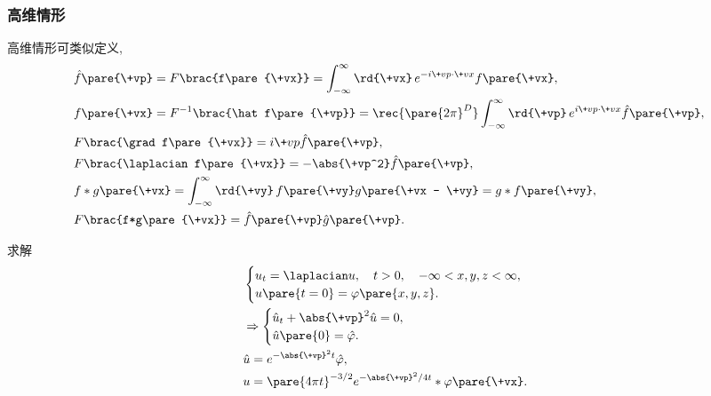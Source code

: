 \documentclass[hidelinks]{ctexart}
\begin{document}


\subsubsection{高维情形} %
\label{ssub:高维情形}

高维情形可类似定义,
\begin{align*}
    & \hat f\pare{\+vp} = F\brac{f\pare{\+vx}} = \int_{-\infty}^\infty \rd{\+vx} \, e^{-i \+vp\cdot \+vx} f\pare{\+vx}, \\
    & f\pare{\+vx} = F^{-1}\brac{\hat f\pare{\+vp}} = \rec{\pare{2\pi}^D} \int_{-\infty}^\infty \rd{\+vp}\, e^{i\+vp\cdot \+vx}\hat f\pare{\+vp}, \\
    & F\brac{\grad f\pare{\+vx}} = i\+vp\hat f\pare{\+vp}, \\
    & F\brac{\laplacian f\pare{\+vx}} = -\abs{\+vp^2}\hat f\pare{\+vp}, \\
    & f * g\pare{\+vx} = \int_{-\infty}^\infty \rd{\+vy}\, f\pare{\+vy}g\pare{\+vx - \+vy} = g*f\pare{\+vy}, \\
    & F\brac{f*g\pare{\+vx}} = \hat f\pare{\+vp}\hat g\pare{\+vp}.
\end{align*}
\begin{sample}
    \begin{ex}
        求解
        \begin{align*}
            & \begin{cases}
            u_t = \laplacian u,\quad t>0,\quad -\infty < x,y,z < \infty, \\
            u\pare{t=0} = \varphi\pare{x,y,z}.
            \end{cases} \\
            & \Rightarrow \begin{cases}
                \hat u_t + \abs{\+vp}^2 \hat u = 0, \\
                \hat u\pare{0} = \hat \varphi.
            \end{cases} \\
            & \hat u = e^{-\abs{\+vp}^2 t}\hat \varphi, \\
            & u = \pare{4\pi t}^{-3/2} e^{-\abs{\+vp}^2/4t}*\varphi\pare{\+vx}.
        \end{align*}
    \end{ex}
\end{sample}

\end{document}
